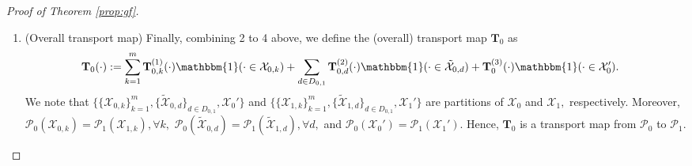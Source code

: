 \documentclass[10pt]{article} %
\begin{document}
\begin{proof}[Proof of Theorem \ref{prop:gf}]
\begin{enumerate}
            For $\mathbf{x} \in \mathcal{X}_{0}',$
            we have
            $ \mathcal{P}_{0}(\mathcal{X}_{0}') = 1 - \left( \sum_{k=1}^{m} \mathcal{P}_{0}(\mathcal{X}_{0, k}) + \sum_{d \in D_{0, 1}} \mathcal{P}_{0} (\tilde{\mathcal{X}_{0, d}}) \right) \le \delta,$
            since
            $ \Delta \textup{TVDP} (f) = \textup{TV} \left( \mathcal{P}_{f(\mathbf{X}, 0) | S = 0}, \mathcal{P}_{f(\mathbf{X}, 1) | S = 1} \right) \le \delta.$
        Furthermore, since $f(\cdot) \in [0, 1],$ we have that
        \begin{equation}\label{eq:prop:gf_3}
            \begin{split}
                & \mathbb{E}_{0} \left( \vert f(\mathbf{X}, 0) - f(\mathbf{T}_{0}^{(3)}(\mathbf{X}), 1) \vert \cdot \mathbbm{1}( \mathbf{X} \in \mathcal{X}_{0}' ) \right)
                = \int \vert f(\mathbf{X}, 0) - f(\mathbf{T}_{0}^{(3)}(\mathbf{X}), 1) \vert \cdot \mathbbm{1}( \mathbf{X} \in \mathcal{X}_{0}' ) d\mathcal{P}_{0}(\mathbf{X})
                \\
                & \le \int \mathbbm{1}( \mathbf{X} \in \mathcal{X}_{0}' ) d\mathcal{P}_{0}(\mathbf{X})
                = \mathcal{P}_{0} ( \mathcal{X}_{0}' )
                \le \delta.
            \end{split}
        \end{equation}

        \item (Overall transport map)
        Finally, combining 2 to 4 above, we define the (overall) transport map $\mathbf{T}_{0}$ as
        \begin{equation}
            \begin{split}
                \mathbf{T}_{0}(\cdot) & := 
                \sum_{k = 1}^{m} \mathbf{T}_{0, k}^{(1)}(\cdot) \mathbbm{1}(\cdot \in \mathcal{X}_{0, k} )
                + \sum_{d \in D_{0, 1}} \mathbf{T}_{0, d}^{(2)}(\cdot) \mathbbm{1}(\cdot \in \tilde{\mathcal{X}}_{0, d} )
                + \mathbf{T}_{0}^{(3)}(\cdot) \mathbbm{1}(\cdot \in \mathcal{X}_{0}' ).
            \end{split}
        \end{equation}
        We note that 
        $
        \big\{
        \{ \mathcal{X}_{0, k} \}_{k=1}^{m},
        \{ \tilde{\mathcal{X}}_{0, d} \}_{d \in D_{0,1}},
        \mathcal{X}_{0}' 
        \big\}
        $
        and
        $
        \big\{
        \{ \mathcal{X}_{1, k} \}_{k=1}^{m},
        \{ \tilde{\mathcal{X}}_{1, d} \}_{d \in D_{0, 1}},
        \mathcal{X}_{1}' 
        \big\}
        $ 
        are partitions of $\mathcal{X}_{0}$ and $\mathcal{X}_{1},$ respectively.
        Moreover,
        $\mathcal{P}_{0} (\mathcal{X}_{0,k}) = \mathcal{P}_{1} (\mathcal{X}_{1,k}), \forall k,$
        $\mathcal{P}_{0} (\tilde{\mathcal{X}}_{0,d}) = \mathcal{P}_{1} (\tilde{\mathcal{X}}_{1,d}), \forall d,$
        and
        $\mathcal{P}_{0}(\mathcal{X}_{0}') = \mathcal{P}_{1}(\mathcal{X}_{1}').$
        Hence, 
        $\mathbf{T}_{0}$ is a transport map from $\mathcal{P}_{0}$ to $\mathcal{P}_{1}.$



\end{enumerate}
\end{proof}
\end{document}
